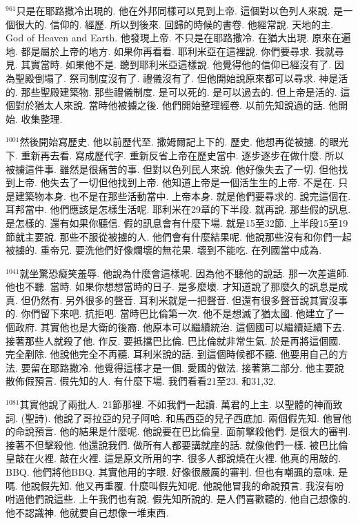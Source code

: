 \documentclass{book}
\begin{document}
$^{961}$只是在耶路撒冷出現的.
他在外邦同樣可以見到上帝.
這個對以色列人來說.
是一個很大的.
信仰的.
經歷.
所以到後來.
回歸的時候的書卷.
他經常說.
天地的主.
God of Heaven and Earth.
他發現上帝.
不只是在耶路撒冷.
在猶大出現.
原來在遍地.
都是屬於上帝的地方.
如果你再看看.
耶利米亞在這裡說.
你們要尋求.
我就尋見.
其實當時.
如果他不是.
聽到耶利米亞這樣說.
他覺得他的信仰已經沒有了.
因為聖殿倒塌了.
祭司制度沒有了.
禮儀沒有了.
但他開始說原來都可以尋求.
神是活的.
那些聖殿建築物.
那些禮儀制度.
是可以死的.
是可以過去的.
但上帝是活的.
這個對於猶太人來說.
當時他被擄之後.
他們開始整理經卷.
以前先知說過的話.
他開始.
收集整理.

$^{1001}$然後開始寫歷史.
他以前歷代至.
撒姆爾記上下的.
歷史.
他想再從被擄.
的眼光下.
重新再去看.
寫成歷代字.
重新反省上帝在歷史當中.
逐步逐步在做什麼.
所以被擄這件事.
雖然是很痛苦的事.
但對以色列民人來說.
他好像失去了一切.
但他找到上帝.
他失去了一切但他找到上帝.
他知道上帝是一個活生生的上帝.
不是在.
只是建築物本身.
也不是在那些活動當中.
上帝本身.
就是他們要尋求的.
說完這個在.
耳邦當中.
他們應該是怎樣生活呢.
耶利米在29章的下半段.
就再說.
那些假的訊息.
是怎樣的.
還有如果你聽信.
假的訊息會有什麼下場.
就是15至32節.
上半段15至19節就主要說.
那些不服從被擄的人.
他們會有什麼結果呢.
他說那些沒有和你們一起被擄的.
重帝兄.
要洗他們好像爛壞的無花果.
壞到不能吃.
在列國當中成為.

$^{1041}$就坐驚恐癡笑羞辱.
他說為什麼會這樣呢.
因為他不聽他的說話.
那一次差遣師.
他也不聽.
當時.
如果你想想當時的日子.
是多麼壞.
才知道說了那麼久的訊息是成真.
但仍然有.
另外很多的聲音.
耳利米就是一把聲音.
但還有很多聲音說其實沒事的.
你們留下來吧.
抗拒吧.
當時巴比倫第一次.
他不是想滅了猶太國.
他建立了一個政府.
其實他也是大衛的後裔.
他原本可以繼續統治.
這個國可以繼續延續下去.
接著那些人就殺了他.
作反.
要抵擋巴比倫.
巴比倫就非常生氣.
於是再將這個國.
完全剷除.
他說他完全不再聽.
耳利米說的話.
到這個時候都不聽.
他要用自己的方法.
要留在耶路撒冷.
他覺得這樣才是一個.
愛國的做法.
接著第二部分.
他主要說散佈假預言.
假先知的人.
有什麼下場.
我們看看21至23.
和31,32.

$^{1081}$其實他說了兩批人.
21節那裡.
不如我們一起讀.
萬君的上主.
以聖體的神而致詞.
(聖詩).
他說了哥拉亞的兒子阿哈.
和馬西亞的兒子西底加.
兩個假先知.
他冒他的命說預言.
他的結果是什麼呢.
他說要在巴比倫皇.
面前擊殺他們.
是很大的審判.
接著不但擊殺他.
他還說我們.
做所有人都要講就座的話.
就像他們一樣.
被巴比倫皇敲在火裡.
敲在火裡.
這是原文所用的字.
很多人都說燒在火裡.
他真的用敲的.
BBQ.
他們將他BBQ.
其實他用的字眼.
好像很嚴厲的審判.
但也有嘲諷的意味.
是嗎.
他說假先知.
他又再重覆.
什麼叫假先知呢.
他說他冒我的命說預言.
我沒有吩咐過他們說這些.
上午我們也有說.
假先知所說的.
是人們喜歡聽的.
他自己想像的.
他不認識神.
他就要自己想像一堆東西.
\end{document}
